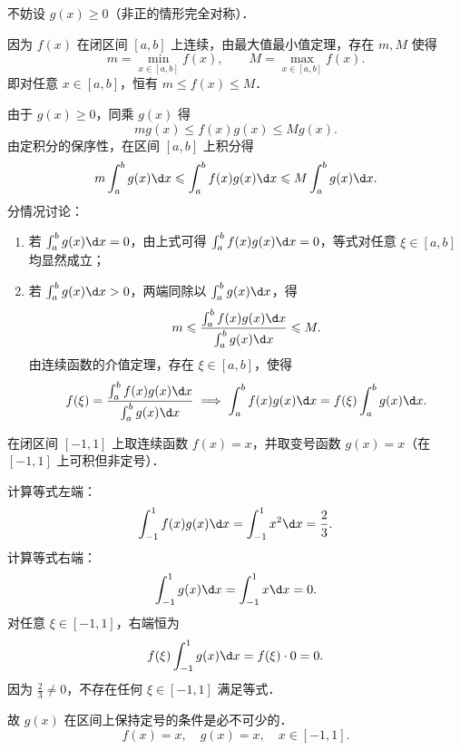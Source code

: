 \begin{solution}

    不妨设 $g(x) \geqslant 0$（非正的情形完全对称）．

    因为 $f(x)$ 在闭区间 $[a, b]$ 上连续，由最大值最小值定理，存在 $m, M$ 使得
    \begin{equation}
        m = \min_{x\in [a, b]} f(x), \qquad M = \max_{x\in [a, b]} f(x).
    \end{equation}
    即对任意 $x \in [a, b]$，恒有 $m \leqslant f(x) \leqslant M$．

    由于 $g(x) \geqslant 0$，同乘 $g(x)$ 得
    \begin{equation}
        m g(x) \leqslant f(x)g(x) \leqslant M g(x).
    \end{equation}
    由定积分的保序性，在区间 $[a, b]$ 上积分得
    \begin{equation}
        m \int_a^b g(x)\d x \leqslant \int_a^b f(x)g(x)\d x \leqslant M \int_a^b g(x)\d x.
    \end{equation}
    分情况讨论：
    \begin{enumerate}
        \item 若 $\int_a^b g(x)\d x = 0$，由上式可得 $\int_a^b f(x)g(x)\d x = 0$，等式对任意 $\xi \in [a, b]$ 均显然成立；
        \item 若 $\int_a^b g(x)\d x > 0$，两端同除以 $\int_a^b g(x)\d x$，得
              \begin{equation}
                  m \leqslant \frac{\int_a^b f(x)g(x)\d x}{\int_a^b g(x)\d x} \leqslant M.
              \end{equation}
              由连续函数的介值定理，存在 $\xi \in [a, b]$，使得
              \begin{equation}
                  f(\xi) = \frac{\int_a^b f(x)g(x)\d x}{\int_a^b g(x)\d x} \implies \int_a^b f(x)g(x)\d x = f(\xi)\int_a^b g(x)\d x.
              \end{equation}
    \end{enumerate}


    在闭区间 $[-1, 1]$ 上取连续函数 $f(x) = x$，并取变号函数 $g(x) = x$（在 $[-1, 1]$ 上可积但非定号）．

    计算等式左端：
    \begin{equation}
        \int_{-1}^1 f(x)g(x)\d x = \int_{-1}^1 x^2 \d x = \frac{2}{3}.
    \end{equation}
    计算等式右端：
    \begin{equation}
        \int_{-1}^1 g(x)\d x = \int_{-1}^1 x\d x = 0.
    \end{equation}
    对任意 $\xi \in [-1, 1]$，右端恒为
    \begin{equation}
        f(\xi)\int_{-1}^1 g(x)\d x = f(\xi) \cdot 0 = 0.
    \end{equation}
    因为 $\frac{2}{3} \neq 0$，不存在任何 $\xi \in [-1, 1]$ 满足等式．

    故 $g(x)$ 在区间上保持定号的条件是必不可少的．
    \begin{equation}
        \boxed{f(x) = x, \quad g(x) = x, \quad x \in [-1, 1].}
    \end{equation}
\end{solution}

